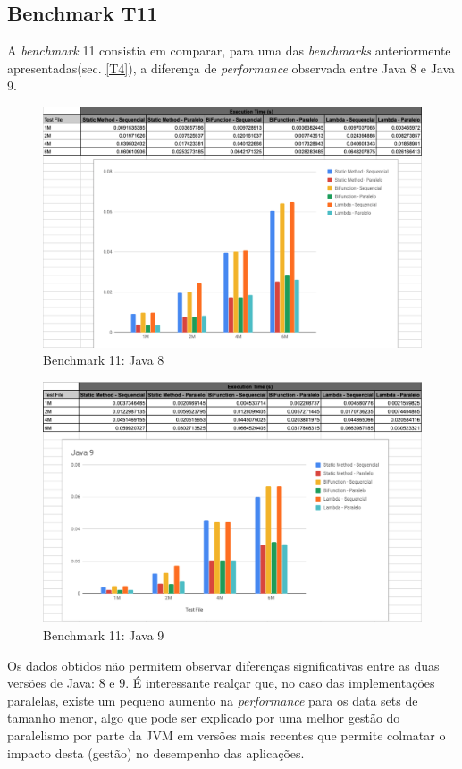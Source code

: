 \documentclass{article}
\begin{document}
\subsection{Benchmark T11}
A \textit{benchmark} 11 consistia em comparar, para uma das \textit{benchmarks} anteriormente apresentadas(sec. \ref{T4}), a diferença de \textit{performance} observada entre Java 8 e Java 9.
\begin{figure}[H]
    \centering
    \includegraphics[width=15cm]{Pictures/T11_8.png}
    \caption{Benchmark 11: Java 8}
\end{figure}


\begin{figure}[H]
    \centering
    \includegraphics[width=15cm]{Pictures/T11_9.png}
    \caption{Benchmark 11: Java 9}
\end{figure}
Os dados obtidos não permitem observar diferenças significativas entre as duas versões de Java: 8 e 9. 
É interessante realçar que, no caso das implementações paralelas, existe um pequeno aumento na \textit{performance} para os data sets de tamanho menor, algo que pode
ser explicado por uma melhor gestão do paralelismo por parte da JVM em versões mais recentes que permite colmatar o impacto desta (gestão) no desempenho das aplicações.
\end{document}
